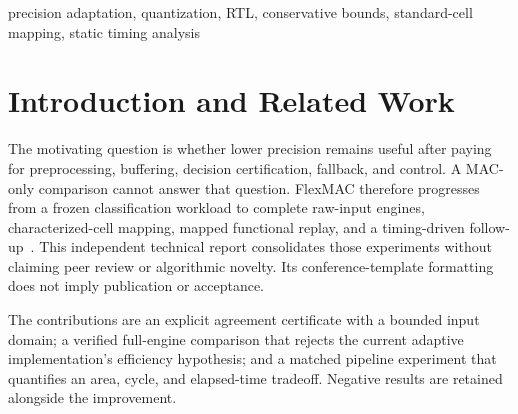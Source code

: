 \begin{abstract}
FlexMAC compares precision adaptation with straightforward parallelism on a frozen ten-class digit classifier. An INT4-first engine uses conservative, input-conditioned score bounds to certify agreement with INT8, otherwise rerunning INT8. It certifies 351 of 359 calibration images, but its complete mapped implementation is larger and slower than a two-lane INT8 baseline. A subsequent register boundary separates completed-score comparison from accumulation. In a matched SKY130 typical-corner experiment, this change reduces no-gap latency from 5.220 to 4.448~$\mu$s at each design's directly tested passing period, with 1.493\% additional cell area. At a common 15~ns clock, its ten additional cycles instead increase latency by 2.604\%. A further overlapping comparison recovers nine cycles but is slightly slower at its own tested period; a bounded synthetic sweep and hierarchy-preserved area diagnostic investigate the limits. These verified, pre-layout results demonstrate the importance of counting certificate hardware and clock-period costs; they establish neither energy savings nor production timing closure.
\end{abstract}
\begin{IEEEkeywords}
precision adaptation, quantization, RTL, conservative bounds, standard-cell mapping, static timing analysis
\end{IEEEkeywords}

\section{Introduction and Related Work}
The motivating question is whether lower precision remains useful after paying for preprocessing, buffering, decision certification, fallback, and control. A MAC-only comparison cannot answer that question. FlexMAC therefore progresses from a frozen classification workload to complete raw-input engines, characterized-cell mapping, mapped functional replay, and a timing-driven follow-up~\cite{flexmac}. This independent technical report consolidates those experiments without claiming peer review or algorithmic novelty. Its conference-template formatting does not imply publication or acceptance.

The contributions are an explicit agreement certificate with a bounded input domain; a verified full-engine comparison that rejects the current adaptive implementation's efficiency hypothesis; and a matched pipeline experiment that quantifies an area, cycle, and elapsed-time tradeoff. Negative results are retained alongside the improvement.

